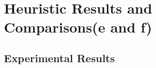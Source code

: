 
\section{Heuristic Results and Comparisons(e and f)}

\subsection{Experimental Results}
\newcommand{\ucstime}{21.9412 ms}
\newcommand{\ucsnode}{12907}
\newcommand{\ucslength}{179.66}
\newcommand{\ucscost}{106.6067}


\newcommand{\aStarHOnetime}{21.6008 ms}
\newcommand{\aStarHOnenode}{10374}
\newcommand{\aStarHOnelength}{0.000  \%}
\newcommand{\aStarHOnecost}{106.6067}

\newcommand{\aStarHTwotime}{2.9807 ms}
\newcommand{\aStarHTwonode}{460}
\newcommand{\aStarHTwolength}{-5.755  \%}
\newcommand{\aStarHTwocost}{132.2630}

\newcommand{\aStarHThreetime}{0.9796 ms}
\newcommand{\aStarHThreenode}{217}
\newcommand{\aStarHThreelength}{-28.877 \%}
\newcommand{\aStarHThreecost}{142.9875}

\newcommand{\aStarHFourtime}{1.8209 ms}
\newcommand{\aStarHFournode}{754}
\newcommand{\aStarHFourlength}{-16.932 \%}
\newcommand{\aStarHFourcost}{127.2441}

\newcommand{\aStarHFivetime}{3.3776 ms}
\newcommand{\aStarHFivenode}{1660}
\newcommand{\aStarHFivelength}{-15.886 \%}
\newcommand{\aStarHFivecost}{115.9203}


\newcommand{\aStarWeightedHOnetime}{23.4999 ms}
\newcommand{\aStarWeightedHOnenode}{9486}
\newcommand{\aStarWeightedHOnelength}{-1.747  \%}
\newcommand{\aStarWeightedHOnecost}{106.6795}

\newcommand{\aStarWeightedHTwotime}{4.2639 ms}
\newcommand{\aStarWeightedHTwonode}{417}
\newcommand{\aStarWeightedHTwolength}{-4.386  \%}
\newcommand{\aStarWeightedHTwocost}{134.4375}

\newcommand{\aStarWeightedHThreetime}{1.9081 ms}
\newcommand{\aStarWeightedHThreenode}{136}
\newcommand{\aStarWeightedHThreelength}{ -33.074 \%}
\newcommand{\aStarWeightedHThreecost}{154.5221}

\newcommand{\aStarWeightedHFourtime}{1.4664 ms}
\newcommand{\aStarWeightedHFournode}{288}
\newcommand{\aStarWeightedHFourlength}{-30.669 \%}
\newcommand{\aStarWeightedHFourcost}{161.9392}

\newcommand{\aStarWeightedHFivetime}{0.9395 ms}
\newcommand{\aStarWeightedHFivenode}{376}
\newcommand{\aStarWeightedHFivelength}{-22.821 \%}
\newcommand{\aStarWeightedHFivecost}{134.1070}

